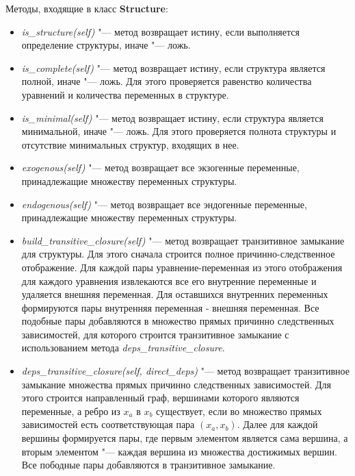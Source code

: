 Методы, входящие в класс \textbf{Structure}:
\begin{itemize}
    \item \textit{is\_structure(self)} "--- метод возвращает истину, если выполняется определение структуры, 
            иначе "--- ложь. 
    \item \textit{is\_complete(self)} "--- метод возвращает истину, если структура является полной, иначе "--- ложь. 
            Для этого проверяется равенство количества уравнений и количества переменных в структуре.
    \item \textit{is\_minimal(self)} "--- метод возвращает истину, если структура является минимальной, 
            иначе "--- ложь. Для этого проверяется полнота структуры и отсутствие минимальных структур, входящих в нее.
    \item \textit{exogenous(self)} "--- метод возвращает все экзогенные переменные, 
            принадлежащие множеству переменных структуры.
    \item \textit{endogenous(self)} "--- метод возвращает все эндогенные переменные, 
            принадлежащие множеству переменных структуры.
    \item \textit{build\_transitive\_closure(self)} "--- метод возвращает транзитивное замыкание для структуры. 
            Для этого сначала строится полное причинно-следственное отображение. Для каждой пары 
            уравнение-переменная из этого отображения для каждого уравнения извлекаются все его внутренние переменные 
            и удаляется внешняя переменная. Для оставшихся внутренних переменных формируются пары внутренняя 
            переменная - внешняя переменная. Все подобные пары добавляются в множество прямых причинно 
            следственных зависимостей, для которого строится транзитивное замыкание с использованием 
            метода \textit{deps\_transitive\_closure}.
    \item \textit{deps\_transitive\_closure(self, direct\_deps)} "--- метод возвращает транзитивное замыкание множества 
            прямых причинно следственных зависимостей. Для этого строится направленный граф, вершинами которого 
            являются переменные, а ребро из $x_a$ в $x_b$ существует, если во множество прямых зависимостей есть 
            соответствующая пара $(x_a, x_b)$. Далее для каждой вершины формируется пары, где первым элементом является 
            сама вершина, а вторым элементом "--- каждая вершина из множества достижимых вершин. Все пободные пары 
            добавляются в транзитивное замыкание.
    

\end{itemize}

